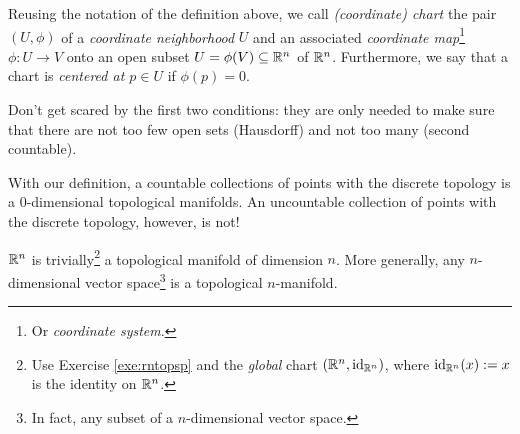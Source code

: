 \begin{notation}
  Reusing the notation of the definition above, we call \emph{(coordinate) chart} the pair $(U, \phi)$ of a \emph{coordinate neighborhood} $U$ and an associated \emph{coordinate map}\footnote{Or \emph{coordinate system}.} $\phi: U\to V$ onto an open subset $U=\phi(V)\subseteq\mathbb{R}^n$ of $\mathbb{R}^n$.
  Furthermore, we say that a chart is \emph{centered at $p\in U$} if $\phi(p) = 0$.
\end{notation}

Don't get scared by the first two conditions: they are only needed to make sure that there are not too few open sets (Hausdorff) and not too many (second countable).

\begin{example}
  With our definition, a countable collections of points with the discrete topology is a $0$-dimensional topological manifolds.
  An uncountable collection of points with the discrete topology, however, is not!
\end{example}

\begin{example}
  $\mathbb{R}^n$ is trivially\footnote{Use Exercise \ref{exe:rntopsp} and the \emph{global} chart $(\mathbb{R}^n, \operatorname{id}_{\mathbb{R}^n})$, where $\operatorname{id}_{\mathbb{R}^n}(x) := x$ is the identity on $\mathbb{R}^n$.} a topological manifold of dimension $n$.
  More generally, any $n$-dimensional vector space\footnote{In fact, any subset of a $n$-dimensional vector space.} is a topological $n$-manifold.
\end{example}

